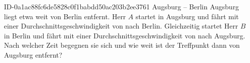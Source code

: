 \begin{exercise}
      {ID-0a1ac88fc6de5828c0f1babdd50ac203b2ee3761}
      {Augsburg -- Berlin}
  \ifproblem\problem
    Augsburg liegt etwa  weit von Berlin entfernt. Herr $A$ startet
    in Augsburg und fährt mit einer Durchschnittsgeschwindigkeit von 
    nach Berlin. Gleichzeitig startet Herr $B$ in Berlin und fährt mit einer
    Durchschnittsgeschwindigkeit von  nach Augsburg.
    Nach welcher Zeit begegnen sie sich und wie weit ist der Treffpunkt dann
    von Augsburg entfernt?
  \fi
\end{exercise}
